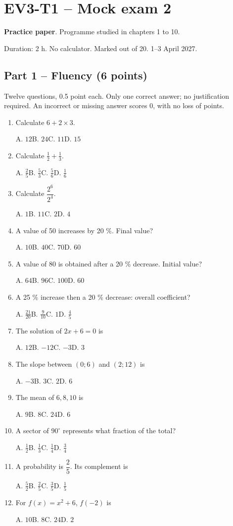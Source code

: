\clearpage\section*{EV3-T1 -- Mock exam 2}\label{EV3-T1}
\textbf{Practice paper}. Programme studied in chapters 1 to 10.\par Duration: 2 h. No calculator. Marked out of 20. 1--3 April 2027.
\subsection*{Part 1 -- Fluency (6 points)}
Twelve questions, 0.5 point each. Only one correct answer; no justification required. An incorrect or missing answer scores 0, with no loss of points.
\begin{enumerate}
\item Calculate $6+2\times3$.\par A. $12$\quad B. $24$\quad C. $11$\quad D. $15$
\item Calculate $\frac12+\frac13$.\par A. $\frac{2}{5}$\quad B. $\frac{5}{3}$\quad C. $\frac{5}{6}$\quad D. $\frac{1}{6}$
\item Calculate $\dfrac{2^6}{2^{4}}$.\par A. $1$\quad B. $11$\quad C. $2$\quad D. $4$
\item A value of 50 increases by 20 \%. Final value?\par A. $10$\quad B. $40$\quad C. $70$\quad D. $60$
\item A value of 80 is obtained after a 20 \% decrease. Initial value?\par A. $64$\quad B. $96$\quad C. $100$\quad D. $60$
\item A 25 \% increase then a 20 \% decrease: overall coefficient?\par A. $\frac{21}{20}$\quad B. $\frac{9}{10}$\quad C. $1$\quad D. $\frac{4}{5}$
\item The solution of $2x+6=0$ is\par A. $12$\quad B. $-12$\quad C. $-3$\quad D. $3$
\item The slope between $(0;6)$ and $(2;12)$ is\par A. $-3$\quad B. $3$\quad C. $2$\quad D. $6$
\item The mean of $6, 8, 10$ is\par A. $9$\quad B. $8$\quad C. $24$\quad D. $6$
\item A sector of $90^\circ$ represents what fraction of the total?\par A. $\frac{1}{2}$\quad B. $\frac{1}{3}$\quad C. $\frac{1}{4}$\quad D. $\frac{3}{4}$
\item A probability is $\dfrac{2}{5}$. Its complement is\par A. $\frac{5}{2}$\quad B. $\frac{2}{5}$\quad C. $\frac{3}{5}$\quad D. $\frac{1}{5}$
\item For $f(x)=x^2+6$, $f(-2)$ is\par A. $10$\quad B. $8$\quad C. $24$\quad D. $2$
\end{enumerate}

